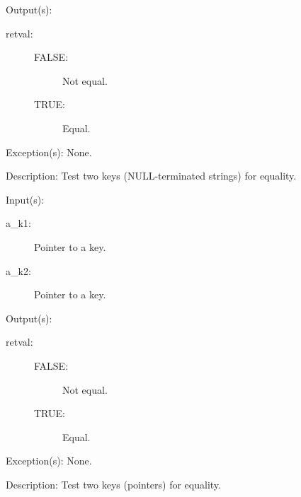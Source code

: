 \begin{capi}
\begin{capilist}
	\item[Output(s): ]
		\begin{description}\item[]
		\item[retval: ]
			\begin{description}\item[]
			\item[FALSE: ]
				Not equal.
			\item[TRUE: ]
				Equal.
			\end{description}
		\end{description}
	\item[Exception(s): ] None.
	\item[Description: ]
		Test two keys (NULL-terminated strings) for equality.
	\end{capilist}
\label{ch_direct_key_comp}
	\begin{capilist}
	\item[Input(s): ]
		\begin{description}\item[]
		\item[a\_k1: ]
			Pointer to a key.
		\item[a\_k2: ]
			Pointer to a key.
		\end{description}
	\item[Output(s): ]
		\begin{description}\item[]
		\item[retval: ]
			\begin{description}\item[]
			\item[FALSE: ]
				Not equal.
			\item[TRUE: ]
				Equal.
			\end{description}
		\end{description}
	\item[Exception(s): ] None.
	\item[Description: ]
		Test two keys (pointers) for equality.
	\end{capilist}
\end{capi}
